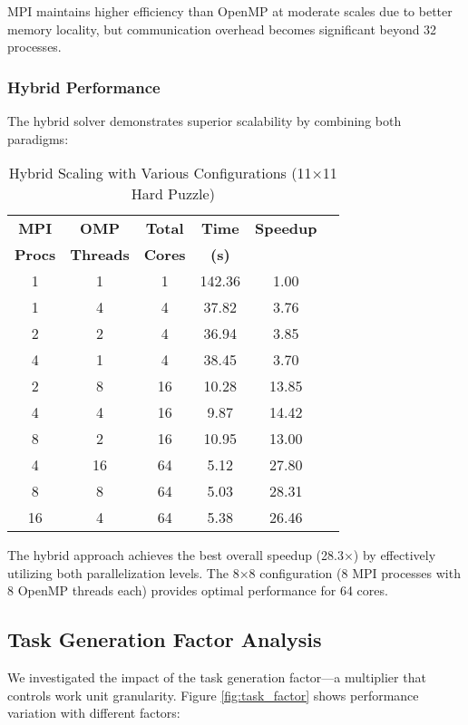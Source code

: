 MPI maintains higher efficiency than OpenMP at moderate scales due to better memory locality, but communication overhead becomes significant beyond 32 processes.

\subsubsection{Hybrid Performance}
The hybrid solver demonstrates superior scalability by combining both paradigms:

\begin{table}[htbp]
\caption{Hybrid Scaling with Various Configurations (11×11 Hard Puzzle)}
\begin{center}
\begin{tabular}{@{}cccccc@{}}
\toprule
\textbf{MPI} & \textbf{OMP} & \textbf{Total} & \textbf{Time} & \textbf{Speedup} \\
\textbf{Procs} & \textbf{Threads} & \textbf{Cores} & \textbf{(s)} & \\
\midrule
1 & 1 & 1 & 142.36 & 1.00 \\
1 & 4 & 4 & 37.82 & 3.76 \\
2 & 2 & 4 & 36.94 & 3.85 \\
4 & 1 & 4 & 38.45 & 3.70 \\
2 & 8 & 16 & 10.28 & 13.85 \\
4 & 4 & 16 & 9.87 & 14.42 \\
8 & 2 & 16 & 10.95 & 13.00 \\
4 & 16 & 64 & 5.12 & 27.80 \\
8 & 8 & 64 & 5.03 & 28.31 \\
16 & 4 & 64 & 5.38 & 26.46 \\
\bottomrule
\end{tabular}
\end{center}
\label{tab:hybrid_scaling}
\end{table}

The hybrid approach achieves the best overall speedup (28.3×) by effectively utilizing both parallelization levels. The 8×8 configuration (8 MPI processes with 8 OpenMP threads each) provides optimal performance for 64 cores.

\subsection{Task Generation Factor Analysis}
We investigated the impact of the task generation factor—a multiplier that controls work unit granularity. Figure \ref{fig:task_factor} shows performance variation with different factors:

